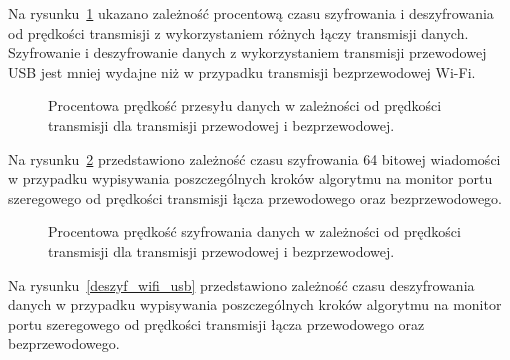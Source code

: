 \documentclass[12p]{article}
\begin{document}
Na rysunku~\ref{czas_przesylu_porownanie} ukazano zależność procentową czasu szyfrowania i deszyfrowania od prędkości transmisji z wykorzystaniem różnych łączy transmisji danych. Szyfrowanie i deszyfrowanie danych z wykorzystaniem transmisji przewodowej USB jest mniej wydajne niż w przypadku transmisji bezprzewodowej Wi-Fi.

\begin{figure}[H]
\centering
{}
\caption{Procentowa prędkość przesyłu danych w zależności od prędkości transmisji dla transmisji przewodowej i bezprzewodowej.}\label{czas_przesylu_porownanie}
\end{figure}

Na rysunku~\ref{szyf_wifi_usb} przedstawiono zależność czasu szyfrowania 64 bitowej wiadomości w przypadku wypisywania poszczególnych kroków algorytmu na monitor portu szeregowego od prędkości transmisji łącza przewodowego oraz bezprzewodowego.

\begin{figure}[H]
\centering
{}
\caption{Procentowa prędkość szyfrowania danych w zależności od prędkości transmisji dla transmisji przewodowej i bezprzewodowej.}\label{szyf_wifi_usb}
\end{figure}
\newpage
Na rysunku~\ref{deszyf_wifi_usb} przedstawiono zależność czasu deszyfrowania danych w przypadku wypisywania poszczególnych kroków algorytmu na monitor portu szeregowego od prędkości transmisji łącza przewodowego oraz bezprzewodowego. 
\end{document}
